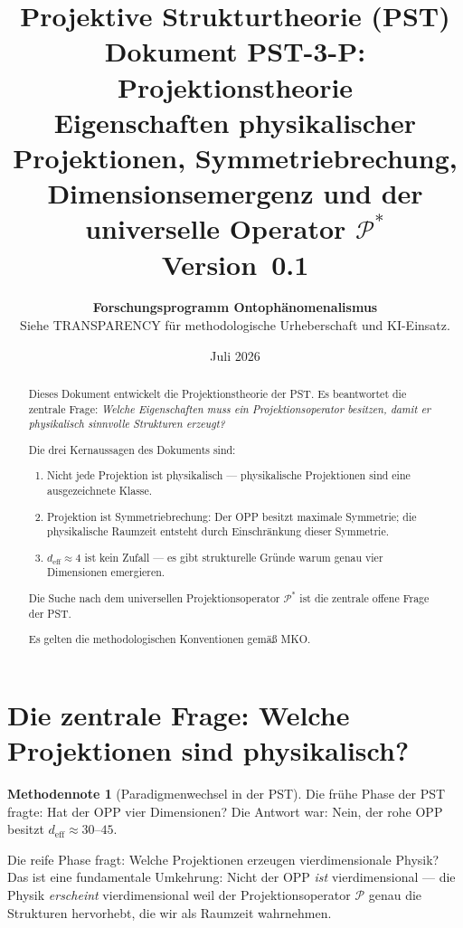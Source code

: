 \documentclass[11pt,a4paper]{article}
\title{
  \textbf{Projektive Strukturtheorie (PST)}\\[0.4em]
  \textbf{Dokument PST-3-P: Projektionstheorie}\\[0.4em]
  {\large Eigenschaften physikalischer Projektionen, Symmetriebrechung,
  Dimensionsemergenz und der universelle Operator $\mathcal{P}^\ast$}\\[0.5em]
  {\normalsize Version~0.1}
}
\author{
  \textbf{Forschungsprogramm Ontoph\"{a}nomenalismus}\\
  \small Siehe TRANSPARENCY f\"{u}r methodologische Urheberschaft
  und KI-Einsatz.
}
\date{Juli 2026}
\theoremstyle{plain}
\theoremstyle{definition}
\newtheorem{methodennote}{Methodennote}[section]
\newcommand{\deff}{d_{\mathrm{eff}}}
\newcommand{\Proj}{\mathcal{P}}
\begin{document}
\maketitle

\begin{abstract}
Dieses Dokument entwickelt die Projektionstheorie der PST. Es beantwortet
die zentrale Frage: \emph{Welche Eigenschaften muss ein Projektionsoperator
besitzen, damit er physikalisch sinnvolle Strukturen erzeugt?}

Die drei Kernaussagen des Dokuments sind:

\begin{enumerate}
  \item Nicht jede Projektion ist physikalisch --- physikalische
        Projektionen sind eine ausgezeichnete Klasse.
  \item Projektion ist Symmetriebrechung: Der OPP besitzt maximale
        Symmetrie; die physikalische Raumzeit entsteht durch
        Einschr\"{a}nkung dieser Symmetrie.
  \item $\deff \approx 4$ ist kein Zufall --- es gibt strukturelle
        Gr\"{u}nde warum genau vier Dimensionen emergieren.
\end{enumerate}

Die Suche nach dem universellen Projektionsoperator $\Proj^\ast$ ist
die zentrale offene Frage der PST.

Es gelten die methodologischen Konventionen gem\"{a}\ss{} MKO.
\end{abstract}

\tableofcontents
\newpage

\section{Die zentrale Frage: Welche Projektionen sind physikalisch?}

\begin{methodennote}[Paradigmenwechsel in der PST]
Die fr\"{u}he Phase der PST fragte: \glqq{}Hat der OPP vier
Dimensionen?\grqq{} Die Antwort war: Nein, der rohe OPP besitzt
$\deff \approx 30$--$45$.

Die reife Phase fragt: \glqq{}Welche Projektionen erzeugen
vierdimensionale Physik?\grqq{} Das ist eine fundamentale Umkehrung:
Nicht der OPP \emph{ist} vierdimensional --- die Physik
\emph{erscheint} vierdimensional weil der Projektionsoperator
$\Proj$ genau die Strukturen hervorhebt, die wir als Raumzeit
wahrnehmen.
\end{methodennote}
\end{document}
